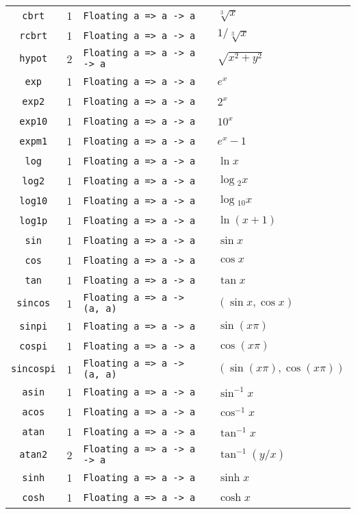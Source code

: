 \begin{longtable}[c]{ccll}
  \texttt{cbrt} & 1 & \texttt{Floating a => a -> a} & $\sqrt[3]{x}$\\
  \texttt{rcbrt} & 1 & \texttt{Floating a => a -> a} & $1/\sqrt[3]{x}$\\
  \texttt{hypot} & 2 & \texttt{Floating a => a -> a -> a} & $\sqrt{x^2+y^2}$\\
  \texttt{exp} & 1 & \texttt{Floating a => a -> a} & $e^x$\\
  \texttt{exp2} & 1 & \texttt{Floating a => a -> a} & $2^x$\\
  \texttt{exp10} & 1 & \texttt{Floating a => a -> a} & $10^x$\\
  \texttt{expm1} & 1 & \texttt{Floating a => a -> a} & $e^x-1$\\
  \texttt{log} & 1 & \texttt{Floating a => a -> a} & $\ln x$\\
  \texttt{log2} & 1 & \texttt{Floating a => a -> a} & $\log{}_2 x$\\
  \texttt{log10} & 1 & \texttt{Floating a => a -> a} & $\log{}_{10} x$\\
  \texttt{log1p} & 1 & \texttt{Floating a => a -> a} & $\ln (x+1)$\\
  \texttt{sin} & 1 & \texttt{Floating a => a -> a} & $\sin x$\\
  \texttt{cos} & 1 & \texttt{Floating a => a -> a} & $\cos x$\\
  \texttt{tan} & 1 & \texttt{Floating a => a -> a} & $\tan x$\\
  \texttt{sincos} & 1 & \texttt{Floating a => a -> (a, a)} & $(\sin x, \cos x)$\\
  \texttt{sinpi} & 1 & \texttt{Floating a => a -> a} & $\sin (x\pi)$\\
  \texttt{cospi} & 1 & \texttt{Floating a => a -> a} & $\cos (x\pi)$\\
  \texttt{sincospi} & 1 & \texttt{Floating a => a -> (a, a)} & $(\sin (x\pi), \cos (x\pi))$\\
  \texttt{asin} & 1 & \texttt{Floating a => a -> a} & $\sin^{-1} x$\\
  \texttt{acos} & 1 & \texttt{Floating a => a -> a} & $\cos^{-1} x$\\
  \texttt{atan} & 1 & \texttt{Floating a => a -> a} & $\tan^{-1} x$\\
  \texttt{atan2} & 2 & \texttt{Floating a => a -> a -> a} & $\tan^{-1} (y/x)$\\
  \texttt{sinh} & 1 & \texttt{Floating a => a -> a} & $\sinh x$\\
  \texttt{cosh} & 1 & \texttt{Floating a => a -> a} & $\cosh x$\\

\end{longtable}
